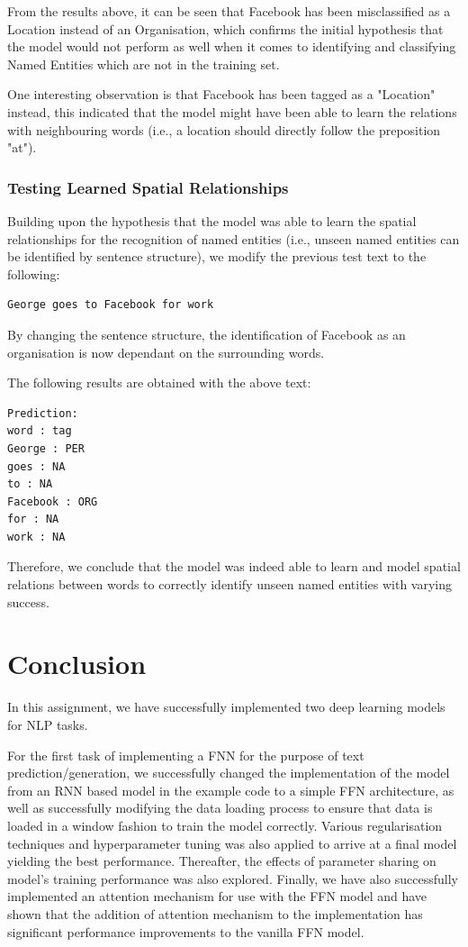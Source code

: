 \documentclass[sigconf,nonacm=true]{acmart}
\begin{document}
From the results above, it can be seen that Facebook has been misclassified as a Location instead of an Organisation, which confirms the initial hypothesis that the model would not perform as well when it comes to identifying and classifying Named Entities which are not in the training set. 

One interesting observation is that Facebook has been tagged as a "Location" instead, this indicated that the model might have been able to learn the relations with neighbouring words (i.e., a location should directly follow the preposition "at").

\subsubsection{Testing Learned Spatial Relationships}

Building upon the hypothesis that the model was able to learn the spatial relationships for the recognition of named entities (i.e., unseen named entities can be identified by sentence structure), we modify the previous test text to the following: 

\begin{lstlisting}
George goes to Facebook for work
\end{lstlisting}

By changing the sentence structure, the identification of Facebook as an organisation is now dependant on the surrounding words. 

The following results are obtained with the above text:
\begin{lstlisting}
Prediction:
word : tag
George : PER
goes : NA
to : NA
Facebook : ORG
for : NA
work : NA
\end{lstlisting}

Therefore, we conclude that the model was indeed able to learn and model spatial relations between words to correctly identify unseen named entities with varying success. 

\section{Conclusion}
In this assignment, we have successfully implemented two deep learning models for NLP tasks. 

For the first task of implementing a FNN for the purpose of text prediction/generation, we successfully changed the implementation of the model from an RNN based model in the example code to a simple FFN architecture, as well as successfully modifying the data loading process to ensure that data is loaded in a window fashion to train the model correctly. Various regularisation techniques and hyperparameter tuning was also applied to arrive at a final model yielding the best performance. Thereafter, the effects of parameter sharing on model's training performance was also explored. Finally, we have also successfully implemented an attention mechanism for use with the FFN model and have shown that the addition of attention mechanism to the implementation has significant performance improvements to the vanilla FFN model.
\end{document}
